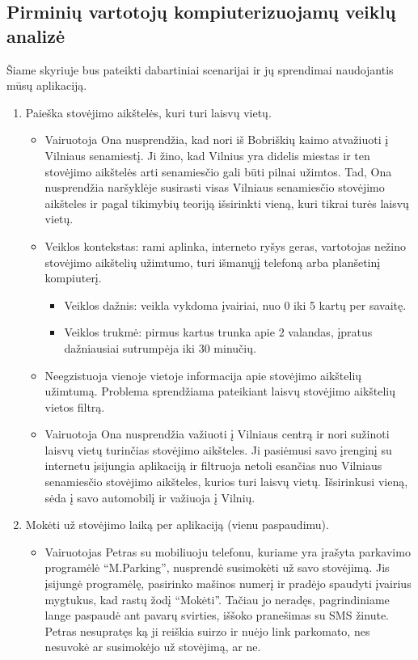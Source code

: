 \documentclass{VUMIFPSkursinis}
\begin{document}
\subsection{Pirminių vartotojų kompiuterizuojamų veiklų analizė}
Šiame skyriuje bus pateikti dabartiniai scenarijai ir jų sprendimai naudojantis mūsų aplikaciją.
\begin{enumerate}[label = \textbf{PV\arabic*.}]
	\item Paieška stovėjimo aikštelės, kuri turi laisvų vietų.
		\begin{itemize}[label={-}]
			\item Vairuotoja Ona nusprendžia, kad nori iš Bobriškių kaimo atvažiuoti į Vilniaus senamiestį. Ji žino, kad Vilnius yra didelis miestas ir ten stovėjimo aikštelės  arti senamiesčio gali būti pilnai užimtos. Tad, Ona nusprendžia naršyklėje susirasti visas Vilniaus senamiesčio stovėjimo aikšteles ir pagal tikimybių teoriją išsirinkti vieną, kuri tikrai turės laisvų vietų.

			\item Veiklos kontekstas: rami aplinka, interneto ryšys geras, vartotojas nežino stovėjimo aikštelių užimtumo, turi išmanųjį telefoną arba planšetinį kompiuterį.
				\begin{itemize}[label={$\bullet$}]
					\item Veiklos dažnis: veikla vykdoma įvairiai, nuo 0 iki 5 kartų per savaitę.
					\item Veiklos trukmė: pirmus kartus trunka apie 2 valandas, įpratus dažniausiai sutrumpėja iki 30 minučių.
				\end{itemize}
			\item Neegzistuoja vienoje vietoje informacija apie stovėjimo aikštelių užimtumą. Problema sprendžiama pateikiant laisvų stovėjimo aikštelių vietos filtrą.

			\item Vairuotoja Ona nusprendžia važiuoti į Vilniaus centrą ir nori sužinoti laisvų vietų turinčias stovėjimo aikšteles. Ji pasiėmusi savo įrenginį su internetu įsijungia aplikaciją ir filtruoja netoli esančias nuo Vilniaus senamiesčio stovėjimo aikšteles, kurios turi laisvų vietų. Išsirinkusi vieną, sėda į savo automobilį ir važiuoja į Vilnių.
		\end{itemize}	
	
		
	\item Mokėti už stovėjimo laiką per aplikaciją (vienu paspaudimu).
		\begin{itemize}[label={-}]
			\item Vairuotojas Petras su mobiliuoju telefonu, kuriame yra įrašyta parkavimo programėlė “M.Parking”, nusprendė susimokėti už savo stovėjimą. Jis įsijungė programėlę, pasirinko mašinos numerį ir pradėjo spaudyti įvairius mygtukus, kad rastų žodį “Mokėti”. Tačiau jo neradęs, pagrindiniame lange paspaudė ant pavarų svirties, iššoko pranešimas su SMS žinute. Petras nesupratęs ką ji reiškia suirzo ir nuėjo link parkomato, nes nesuvokė ar susimokėjo už stovėjimą, ar ne.


\end{itemize}
\end{enumerate}
\end{document}
